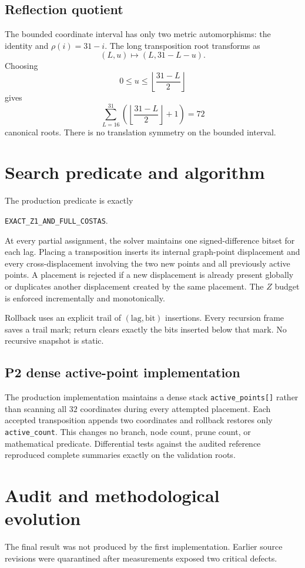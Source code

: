 \documentclass[11pt,a4paper]{article}
\theoremstyle{definition}\newtheorem{definition}[theorem]{Definition}
\theoremstyle{remark}\newtheorem{remark}[theorem]{Remark}
\newcommand{\code}[1]{\texttt{#1}}
\begin{document}
\subsection{Reflection quotient}
The bounded coordinate interval has only two metric automorphisms: the identity and $\rho(i)=31-i$. The long transposition root transforms as
\[
(L,u)\mapsto(L,31-L-u).
\]
Choosing
\[
0\le u\le\left\lfloor\frac{31-L}{2}\right\rfloor
\]
gives
\[
\sum_{L=16}^{31}\left(\left\lfloor\frac{31-L}{2}\right\rfloor+1\right)=72
\]
canonical roots. There is no translation symmetry on the bounded interval.

\section{Search predicate and algorithm}
The production predicate is exactly
\begin{center}
\code{EXACT\_Z1\_AND\_FULL\_COSTAS}.
\end{center}
At every partial assignment, the solver maintains one signed-difference bitset for each lag. Placing a transposition inserts its internal graph-point displacement and every cross-displacement involving the two new points and all previously active points. A placement is rejected if a new displacement is already present globally or duplicates another displacement created by the same placement. The $Z$ budget is enforced incrementally and monotonically.

Rollback uses an explicit trail of $(\text{lag},\text{bit})$ insertions. Every recursion frame saves a trail mark; return clears exactly the bits inserted below that mark. No recursive snapshot is static.

\subsection{P2 dense active-point implementation}
The production implementation maintains a dense stack \code{active\_points[]} rather than scanning all $32$ coordinates during every attempted placement. Each accepted transposition appends two coordinates and rollback restores only \code{active\_count}. This changes no branch, node count, prune count, or mathematical predicate. Differential tests against the audited reference reproduced complete summaries exactly on the validation roots.

\section{Audit and methodological evolution}
The final result was not produced by the first implementation. Earlier source revisions were quarantined after measurements exposed two critical defects.
\end{document}

